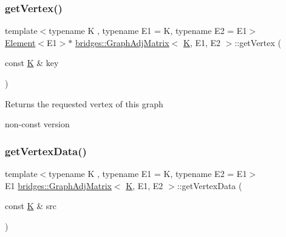 \subsubsection{\texorpdfstring{getVertex()}{getVertex()}\hspace{0.1cm}{\footnotesize\ttfamily [2/2]}}
{\footnotesize\ttfamily template$<$typename K , typename E1  = K, typename E2  = E1$>$ \\
\mbox{\hyperlink{classbridges_1_1_element}{Element}}$<$E1$>$$\ast$ \mbox{\hyperlink{classbridges_1_1_graph_adj_matrix}{bridges\+::\+Graph\+Adj\+Matrix}}$<$ \mbox{\hyperlink{namespacebridges_acfb0a4f7877d8f63de3e6862004c50edaa5f3c6a11b03839d46af9fb43c97c188}{K}}, E1, E2 $>$\+::get\+Vertex (\begin{DoxyParamCaption}\item[{const \mbox{\hyperlink{namespacebridges_acfb0a4f7877d8f63de3e6862004c50edaa5f3c6a11b03839d46af9fb43c97c188}{K}} \&}]{key }\end{DoxyParamCaption})\hspace{0.3cm}{\ttfamily [inline]}}

\begin{DoxyReturn}{Returns}
the requested vertex of this graph
\end{DoxyReturn}
non-\/const version \mbox{\label{classbridges_1_1_graph_adj_matrix_a11be29f76acebc6fd9a495ba81dc883d}} 
\subsubsection{\texorpdfstring{getVertexData()}{getVertexData()}}
{\footnotesize\ttfamily template$<$typename K , typename E1  = K, typename E2  = E1$>$ \\
E1 \mbox{\hyperlink{classbridges_1_1_graph_adj_matrix}{bridges\+::\+Graph\+Adj\+Matrix}}$<$ \mbox{\hyperlink{namespacebridges_acfb0a4f7877d8f63de3e6862004c50edaa5f3c6a11b03839d46af9fb43c97c188}{K}}, E1, E2 $>$\+::get\+Vertex\+Data (\begin{DoxyParamCaption}\item[{const \mbox{\hyperlink{namespacebridges_acfb0a4f7877d8f63de3e6862004c50edaa5f3c6a11b03839d46af9fb43c97c188}{K}} \&}]{src }\end{DoxyParamCaption})\hspace{0.3cm}{\ttfamily [inline]}}

